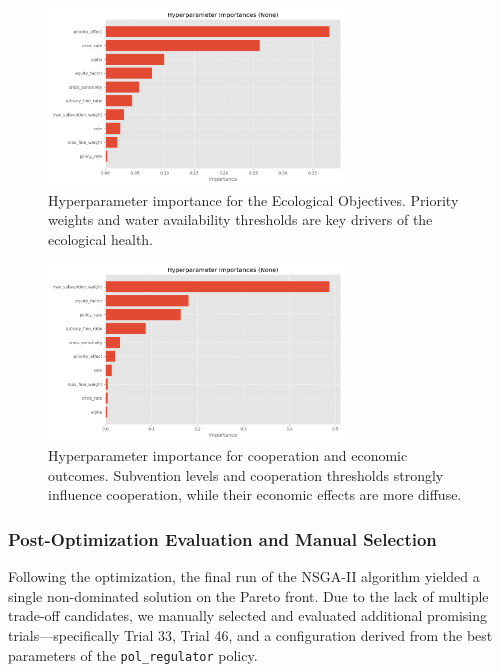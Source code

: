 \documentclass[ruler]{CUP-JNL-EDS}%
\begin{document}
\begin{figure}[h]
    \centering
    \includegraphics[width=0.7\textwidth]{./assets/images/optimization_hyp_importances_ecol.png}
    \caption{Hyperparameter importance for the Ecological Objectives. Priority weights and water availability thresholds are key drivers of the ecological health.}
    \label{fig:importance_satisfaction_ecology}
\end{figure}

\begin{figure}[h]
    \centering
    \includegraphics[width=0.7\textwidth]{./assets/images/optimization_hyp_importances_econ.png}
    \caption{Hyperparameter importance for cooperation and economic outcomes. Subvention levels and cooperation thresholds strongly influence cooperation, while their economic effects are more diffuse.}
    \label{fig:importance_cooperation_economy}
\end{figure}

\subsubsection{Post-Optimization Evaluation and Manual Selection}

Following the optimization, the final run of the NSGA-II algorithm yielded a single non-dominated solution on the Pareto front. Due to the lack of multiple trade-off candidates, we manually selected and evaluated additional promising trials—specifically Trial 33, Trial 46, and a configuration derived from the best parameters of the \texttt{pol\_regulator} policy.
\end{document}
